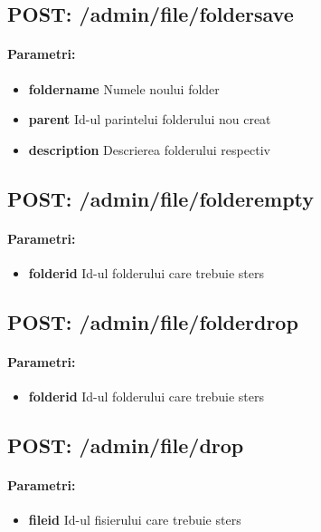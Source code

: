  \subsection*{POST: /admin/file/foldersave}

\paragraph{Parametri:}
\begin{itemize}
\item \textbf{foldername}
 Numele noului folder
\item \textbf{parent}
 Id-ul parintelui folderului nou creat
\item \textbf{description}
 Descrierea folderului respectiv
 \end{itemize}
 \subsection*{POST: /admin/file/folderempty}

\paragraph{Parametri:}
\begin{itemize}
\item \textbf{folderid}
 Id-ul folderului care trebuie sters
 \end{itemize}
 \subsection*{POST: /admin/file/folderdrop}

\paragraph{Parametri:}
\begin{itemize}
\item \textbf{folderid}
 Id-ul folderului care trebuie sters
 \end{itemize}
 \subsection*{POST: /admin/file/drop}

\paragraph{Parametri:}
\begin{itemize}
\item \textbf{fileid}
 Id-ul fisierului care trebuie sters
 \end{itemize}
